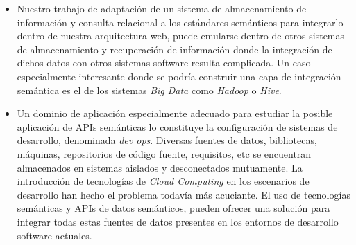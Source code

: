 \begin{itemize}
  \item Nuestro trabajo de adaptaci\'on de un sistema de almacenamiento de informaci\'on y consulta relacional a los est\'andares sem\'anticos para integrarlo dentro de nuestra arquitectura web, puede emularse dentro de otros sistemas de almacenamiento y recuperaci\'on de informaci\'on donde la integraci\'on de dichos datos con otros sistemas software resulta complicada. Un caso especialmente interesante donde se podr\'ia construir una capa de integraci\'on sem\'antica es el de los sistemas \textit{Big Data} como \textit{Hadoop} o \textit{Hive}.
  \item Un dominio de aplicaci\'on especialmente adecuado para estudiar la posible aplicaci\'on de APIs sem\'anticas lo constituye la configuraci\'on de sistemas de desarrollo, denominada \textit{dev ops}. Diversas fuentes de datos, bibliotecas, m\'aquinas, repositorios de c\'odigo fuente, requisitos, etc se encuentran almacenados en sistemas aislados y desconectados mutuamente. La introducci\'on de tecnolog\'ias de \textit{Cloud Computing} en los escenarios de desarrollo han hecho el problema todav\'ia m\'as acuciante. El uso de tecnolog\'ias sem\'anticas y APIs de datos sem\'anticos, pueden ofrecer una soluci\'on para integrar todas estas fuentes de datos presentes en los entornos de desarrollo software actuales.
\end{itemize}